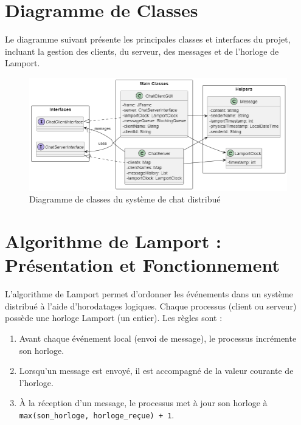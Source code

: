 \documentclass[a4paper,12pt]{article}
\begin{document}
\section{Diagramme de Classes}
Le diagramme suivant présente les principales classes et interfaces du projet, incluant la gestion des clients, du serveur, des messages et de l'horloge de Lamport.

\begin{figure}[ht!]
    \centering
    \includegraphics[width=1\textwidth]{class.png}
    \caption{Diagramme de classes du système de chat distribué}
\end{figure}
\FloatBarrier


\section{Algorithme de Lamport : Présentation et Fonctionnement}
L'algorithme de Lamport permet d'ordonner les événements dans un système distribué à l'aide d'horodatages logiques. Chaque processus (client ou serveur) possède une horloge Lamport (un entier). Les règles sont :
\begin{enumerate}
    \item Avant chaque événement local (envoi de message), le processus incrémente son horloge.
    \item Lorsqu'un message est envoyé, il est accompagné de la valeur courante de l'horloge.
    \item À la réception d'un message, le processus met à jour son horloge à \texttt{max(son\_horloge, horloge\_reçue) + 1}.
\end{enumerate}
\end{document}
